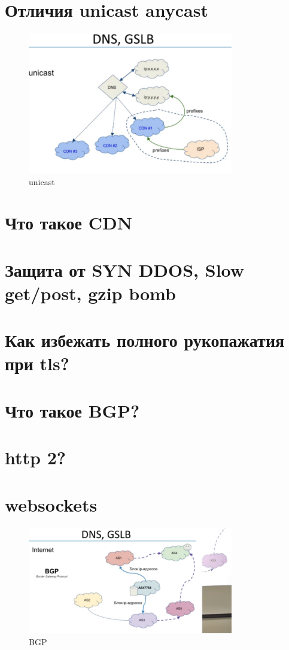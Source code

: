\section{Отличия unicast anycast}

\begin{figure}[h!]
\centering
\includegraphics[width=0.8\textwidth]{unicast}
\caption{unicast}
\label{unicast}
\end{figure}

\section{Что такое CDN}

\section{Защита от SYN DDOS, Slow get/post, gzip bomb}

\section{Как избежать полного рукопажатия при tls?}

\section{Что такое BGP?}

\section{http 2?}

\section{websockets}

\begin{figure}[h!]
\centering
\includegraphics[width=0.8\textwidth]{BGP}
\caption{BGP}
\label{BGP}
\end{figure}

